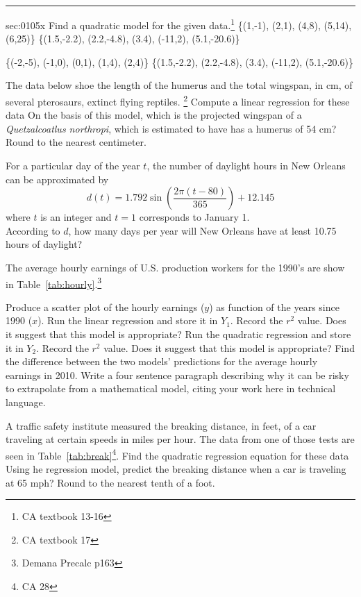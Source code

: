 \renewcommand{\columnseprule}{1.5pt}
\begin{multicols*}{2}
\rule[0.5\baselineskip]{0.4\textwidth}{1pt}
\noindent%
\ExSection\label{sec:0105x}
\begin{exercises}{sec:0105x}
\prob[0105Quad1] Find a quadratic model for the given data.\footnote{CA textbook 13-16}
\subprob \{(1,-1), (2,1), (4,8), (5,14), (6,25)\}
\subprob \{(1.5,-2.2), (2.2,-4.8), (3.4), (-11,2), (5.1,-20.6)\}

\prob[0105Quad2]
\subprob \{(-2,-5), (-1,0), (0,1), (1,4), (2,4)\}
\subprob \{(1.5,-2.2), (2.2,-4.8), (3.4), (-11,2), (5.1,-20.6)\}

\prob[0105Arch] The data below shoe the length of the humerus and the total wingspan, in
cm, of several pterosaurs, extinct flying reptiles. \footnote{CA textbook 17}
\subprob Compute a linear regression for these data
\subprob On the basis of this model, which is the projected wingspan of a 
\textit{Quetzalcoatlus northropi}, which is estimated to have has a humerus of 54 cm?  
Round to the nearest centimeter.



\prob[0105ModelDay] For a particular day of the year $t$, the number of 
daylight hours in New Orleans can be approximated by 
$$
d(t)=1.792\sin\left(\dfrac{2\pi(t-80)}{365}\right) + 12.145
$$
where $t$ is an integer and $t=1$ corresponds to January 1.\\ According to $d$, 
how many days per year will New Orleans have at least 10.75 hours of daylight?



\prob[0105Hourly] The average hourly earnings of U.S. production
workers for the 1990's are show in Table~\ref{tab:hourly}.\footnote{Demana Precalc p163}


\subprob Produce a scatter plot of the hourly earnings ($y$) as function
of the years since 1990 ($x$).
\subprob Run the linear regression and store it in $Y_1$.
\subprob Record the $r^2$ value.  Does it suggest that this model is appropriate?
\subprob Run the quadratic regression and store it in $Y_2$.
\subprob Record the $r^2$ value.  Does it suggest that this model is appropriate?
\subprob Find the difference between the two models' predictions for the average hourly earnings in 2010.
\subprob Write a four sentence paragraph describing why it can be risky to extrapolate from a mathematical
model, citing your work here in technical language.


\prob[0105traffic]
A traffic safety institute measured the breaking
distance, in feet, of a car traveling at certain speeds in miles per hour.
The data from one of those tests are seen in Table~\ref{tab:break}\footnote{CA 28}.
\subprob Find the quadratic regression equation for these data
\subprob Using he regression model, predict the breaking distance
when a car is traveling at 65 mph?  Round to the nearest tenth
of a foot.



\end{exercises}
\end{multicols*}
